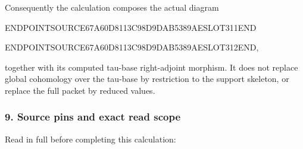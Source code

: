 Consequently the calculation composes the actual diagram

ENDPOINTSOURCE67A60D8113C98D9DAB5389AESLOT311END

ENDPOINTSOURCE67A60D8113C98D9DAB5389AESLOT312END,

together with its computed tau-base right-adjoint morphism. It does not replace global cohomology over the tau-base by restriction to the support skeleton, or replace the full packet by reduced values.

\subsubsection{9. Source pins and exact read scope}\label{endpoint-f1_scaling--source-pins-and-exact-read-scope}

Read in full before completing this calculation:


